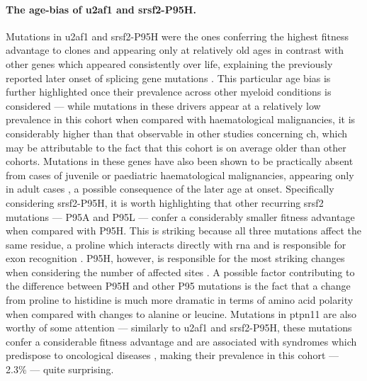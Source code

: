\paragraph{The age-bias of \ac{u2af1} and \ac{srsf2}-P95H.} Mutations in \ac{u2af1} and \ac{srsf2}-P95H were the ones conferring the highest fitness advantage to clones and appearing only at relatively old ages in contrast with other genes which appeared consistently over life, explaining the previously reported later onset of splicing gene mutations \cite{McKerrell2015-rl}. This particular age bias is further highlighted once their prevalence across other myeloid conditions is considered \cite{fig:prevalence-srsf2-p95h-u2af1} --- while mutations in these drivers appear at a relatively low prevalence in this cohort when compared with haematological malignancies, it is considerably higher than that observable in other studies concerning \ac{ch}, which may be attributable to the fact that this cohort is on average older than other cohorts. Mutations in these genes have also been shown to be practically absent from cases of juvenile or paediatric haematological malignancies, appearing only in adult cases \cite{Kar2013-nw,Takita2012-yo}, a possible consequence of the later age at onset. Specifically considering \ac{srsf2}-P95H, it is worth highlighting that other recurring \ac{srsf2} mutations --- P95A and P95L --- confer a considerably smaller fitness advantage when compared with P95H. This is striking because all three mutations affect the same residue, a proline which interacts directly with \ac{rna} and is responsible for exon recognition \cite{Daubner2012-zp,Kim2015-qz}. P95H, however, is responsible for the most striking changes when considering the number of affected sites \cite{Rahman2020-bh,Zhang2015-xu}. A possible factor contributing to the difference between P95H and other P95 mutations is the fact that a change from proline to histidine is much more dramatic in terms of amino acid polarity when compared with changes to alanine or leucine. Mutations in \ac{ptpn11} are also worthy of some attention --- similarly to \ac{u2af1} and \ac{srsf2}-P95H, these mutations confer a considerable fitness advantage and are associated with syndromes which predispose to oncological diseases \cite{Digilio2002-nq,Tartaglia2001-ru,Kratz2005-qh}, making their prevalence in this cohort --- 2.3\% --- quite surprising.

